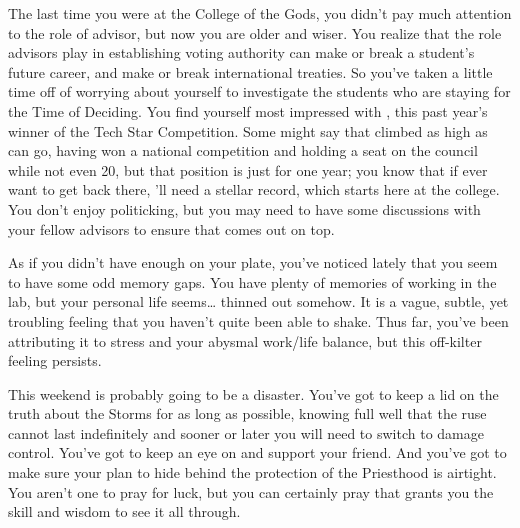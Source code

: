\documentclass[char]{GL2020}
\begin{document}
The last time you were at the College of the Gods, you didn't pay much attention to the role of advisor, but now you are older and wiser. You realize that the role advisors play in establishing voting authority can make or break a student's future career, and make or break international treaties. So you've taken a little time off of worrying about yourself to investigate the \pTech{} students who are staying for the Time of Deciding. You find yourself most impressed with \cTechStar{\full}, this past year's winner of the Tech Star Competition. Some might say that \cTechStar{\they} \cTechStar{\have} climbed as high as \cTechStar{\they} can go, having won a national competition and holding a seat on the council while not even 20, but that position is just for one year; you know that if \cTechStar{\they} ever want to get back there, \cTechStar{\they}'ll need a stellar record, which starts here at the college. You don't enjoy politicking, but you may need to have some discussions with your fellow advisors to ensure that \cTechStar{} comes out on top.

As if you didn't have enough on your plate, you've noticed lately that you seem to have some odd memory gaps. You have plenty of memories of working in the lab, but your personal life seems\ldots{} thinned out somehow. It is a vague, subtle, yet troubling feeling that you haven't quite been able to shake. Thus far, you've been attributing it to stress and your abysmal work/life balance, but this off-kilter feeling persists.

This weekend is probably going to be a disaster. You've got to keep a lid on the truth about the Storms for as long as possible, knowing full well that the ruse cannot last indefinitely and sooner or later you will need to switch to damage control. You've got to keep an eye on \cChupInventor{} and support your friend. And you've got to make sure your plan to hide behind the protection of the Priesthood is airtight. You aren't one to pray for luck, but you can certainly pray that \cTechGod{} grants you the skill and wisdom to see it all through.
\end{document}

